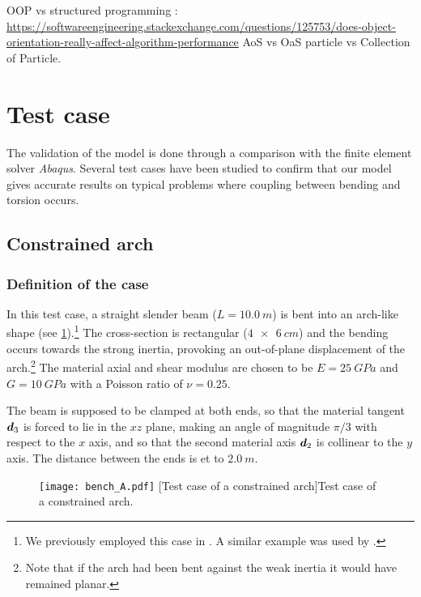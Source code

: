 OOP vs structured programming : \url{https://softwareengineering.stackexchange.com/questions/125753/does-object-orientation-really-affect-algorithm-performance}
AoS vs OaS particle vs Collection of Particle.

\clearpage

\clearpage
\section{Test case}\label{sec=testcase}

The validation of the model is done through a comparison with the finite element solver \emph{Abaqus}. Several test cases have been studied to confirm that our model gives accurate results on typical problems where coupling between bending and torsion occurs.

\subsection{Constrained arch}\label{sec=testcase}

\subsubsection{Definition of the case}

In this test case, a straight slender beam ($L = \SI{10.0}{m}$) is bent into an arch-like shape (see \cref{fig:bench_arch}).\footnote{We previously employed this case in \cite{Lefevre}. A similar example was used by .} The cross-section is rectangular ($\SI{4x6}{cm}$) and the bending occurs towards the strong inertia, provoking an out-of-plane displacement of the arch.\footnote{Note that if the arch had been bent against the weak inertia it would have remained planar.} The material axial and shear modulus are chosen to be $E=\SI{25}{GPa}$ and $G=\SI{10}{GPa}$ with a Poisson ratio of $\nu=0.25$.

The beam is supposed to be clamped at both ends, so that the material tangent $\boldsymbol{d}_3$ is forced to lie in the $xz$ plane, making an angle of magnitude $\pi/3$ with respect to the $x$ axis, and so that the second material axis $\boldsymbol{d}_2$ is collinear to the $y$ axis. The distance between the ends is et to $\SI{2.0}{m}$.
\begin{figure}[!h]
     	\centering
	\texttt{[image: bench\_A.pdf]}
	[Test case of a constrained arch]{Test case of a constrained arch.}
	\label{fig:bench_arch} 
\end{figure}

